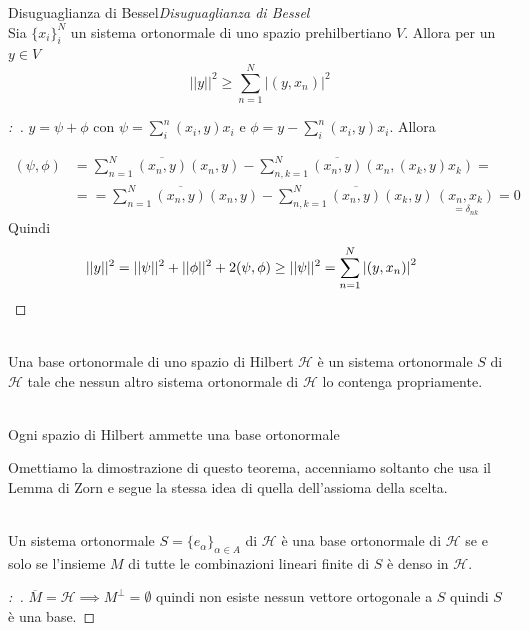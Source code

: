 \documentclass[11pt,a4paper,twoside]{book}
\newenvironment{teorema}[1][\empty]{\begin{Teorema}{
\ifx\empty#1\relax\else\mdseries\itshape#1\\\fi
}{}}{\end{Teorema}}
\newenvironment{definizione}[1][\empty]{\begin{Definizione}{
\ifx\empty#1\relax\else\mdseries\itshape#1\\\fi
}{}}{\end{Definizione}}
\newenvironment{lemma}[1][\empty]{\begin{Lemma}{
\ifx\empty#1\relax\else\mdseries\itshape#1\\\fi
}{}}{\end{Lemma}}
\newenvironment{dimo}[1][\proofname]{
	\begin{tcolorbox}[
	breakable, 
	enhanced, 
	interior hidden, 
	frame hidden, 
	borderline west = {1pt}{0pt}{gray}, 
	top=0pt, bottom=0pt, left=0pt]
\begin{proof}[#1:~]
}
{
\end{proof}
\end{tcolorbox}
}
\theoremstyle{esss}
\theoremstyle{dotless}
\numberwithin{equation}{section} %
\begin{document}
\begin{teorema}[Disuguaglianza di Bessel] Sia $\{x_i\}_i^N$ un sistema ortonormale di uno spazio prehilbertiano $V$. Allora per un $y\in V$ \[\left|\left| y\right|\right|^2\geq\sum_{n=1}^N \left|(y,x_n)\right|^2\]
\end{teorema}

\begin{dimo} 
$y=\psi+\phi$ con $\psi=\sum_i^n (x_i,y)x_i$ e $\phi=y-\sum_i^n (x_i,y)x_i$. Allora

\begin{align*} 
(\psi,\phi)&=\sum_{n=1}^N \overline{(x_n,y)}(x_n,y)-\sum_{n,k=1}^N \overline{(x_n,y)} \left(x_n,(x_k,y)x_k\right)=\\
&==\sum_{n=1}^N \overline{(x_n,y)}(x_n,y)-\sum_{n,k=1}^N \overline{(x_n,y)} (x_k,y)   \,
\underset{=\delta_{nk}}{\left(x_n,x_k\right)}
=0
\end{align*}
Quindi
\begin{align*} 
||y||^2&= ||\psi||^2+||\phi||^2+2(\psi,\phi)\geq||\psi||^2=\sum_{n=1}^N \left|(y,x_n)\right|^2 \qedhere
\end{align*}
\end{dimo}

\begin{definizione}Una base ortonormale di uno spazio di Hilbert $\mathcal{H}$ è un sistema ortonormale $S$ di $\mathcal{H}$ tale che nessun altro sistema ortonormale di $\mathcal{H}$ lo contenga propriamente.\end{definizione}

\begin{teorema}Ogni spazio di Hilbert ammette una base ortonormale\end{teorema}

Omettiamo la dimostrazione di questo teorema, accenniamo soltanto che usa il Lemma di Zorn e segue la stessa idea di quella dell'assioma della scelta.

\begin{lemma}\label{lemmaSistemaBaseDenso}
Un sistema ortonormale $S=\{e_\alpha\}_{\alpha\in A}$ di $\mathcal{H}$ è una base ortonormale di $\mathcal{H}$ se e solo se l'insieme $M$ di tutte le combinazioni lineari finite di $S$ è denso in $\mathcal{H}$.
\end{lemma}

\begin{dimo}
$\overline{M}=\mathcal{H}\implies M^\perp=\emptyset$  quindi non esiste nessun vettore ortogonale a $S$ quindi $S$ è una base.

\end{dimo}
\end{document}
